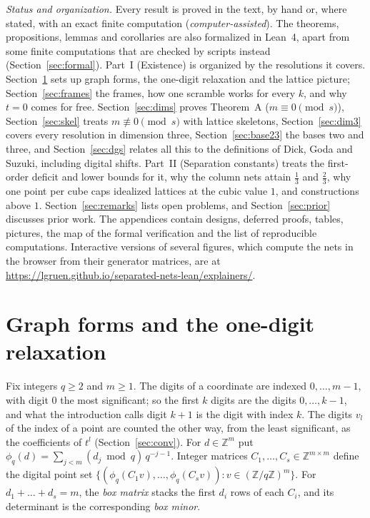 \documentclass[11pt]{amsart}
\makeatletter
\theoremstyle{definition}
\theoremstyle{plain}
\renewcommand\part{\@startsection{part}{0}{\z@}{2\linespacing\@plus\linespacing}{\linespacing}{\normalfont\large\bfseries\centering}}
\newcommand{\Z}{\mathbb{Z}}
\makeatother
\begin{document}
\emph{Status and organization.} Every result is proved in the text, by hand or, where stated, with an exact finite computation (\emph{computer-assisted}). The theorems, propositions, lemmas and corollaries are also formalized in Lean~4, apart from some finite computations that are checked by scripts instead (Section~\ref{sec:formal}). Part~I (Existence) is organized by the resolutions it covers. Section~\ref{sec:prelim} sets up graph forms, the one-digit relaxation and the lattice picture; Section~\ref{sec:frames} the frames, how one scramble works for every $k$, and why $t=0$ comes for free. Section~\ref{sec:dims} proves Theorem~A ($m\equiv0\pmod s$), Section~\ref{sec:skel} treats $m\not\equiv0\pmod s$ with lattice skeletons, Section~\ref{sec:dim3} covers every resolution in dimension three, Section~\ref{sec:base23} the bases two and three, and Section~\ref{sec:dgs} relates all this to the definitions of Dick, Goda and Suzuki, including digital shifts. Part~II (Separation constants) treats the first-order deficit and lower bounds for it, why the column nets attain $\frac13$ and $\frac23$, why one point per cube caps idealized lattices at the cubic value $1$, and constructions above $1$. Section~\ref{sec:remarks} lists open problems, and Section~\ref{sec:prior} discusses prior work. The appendices contain designs, deferred proofs, tables, pictures, the map of the formal verification and the list of reproducible computations. Interactive versions of several figures, which compute the nets in the browser from their generator matrices, are at \url{https://lgruen.github.io/separated-nets-lean/explainers/}.

\part{Existence}\label{part:existence}

\section{Graph forms and the one-digit relaxation}\label{sec:prelim}
Fix integers $q\ge2$ and $m\ge1$. The digits of a coordinate are indexed $0,\dots,m-1$, with digit $0$ the most significant; so the first $k$ digits are the digits $0,\dots,k-1$, and what the introduction calls digit $k+1$ is the digit with index $k$. The digits $v_l$ of the index of a point are counted the other way, from the least significant, as the coefficients of $t^l$ (Section~\ref{sec:conv}). For $d\in\Z^m$ put $\phi_q(d)=\sum_{j<m}(d_j\bmod q)\,q^{-j-1}$. Integer matrices $C_1,\dots,C_s\in\Z^{m\times m}$ define the digital point set $\{(\phi_q(C_1v),\dots,\phi_q(C_sv)) : v\in(\Z/q\Z)^m\}$. For $d_1+\dots+d_s=m$, the \emph{box matrix} stacks the first $d_i$ rows of each $C_i$, and its determinant is the corresponding \emph{box minor}.
\end{document}
